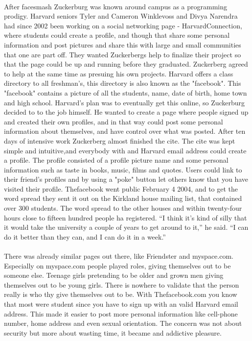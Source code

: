 \paragraph{}
After facesmash Zuckerburg was known around campus as a programming prodigy. Harvard seniors Tyler and Cameron Winklevoss and Divya Narendra had since 2002 been working on a social networking page - HarvardConnection, where students could create a profile, and though that share some personal information and post pictures and share this with large and small communities that one are part off. They wanted Zuckerbergs help to finalize their project so that the page could be up and running before they graduated. Zuckerberg agreed to help at the same time as presuing his own projects. Harvard offers a class directory to all freshman's, this directory is also known as the "facebook". This "facebook" contains a picture of all the students, name, date of birth, home town and high school. Harvard's plan was to eventually get this online, so Zuckerburg decided to to the job himself. He wanted to create a page where people signed up and created their own profiles, and in that way could post some personal information about themselves, and have control over what was posted. After ten days of intensive work Zuckerberg almost finished the cite. The cite was kept simple and intuitive,and everybody with and Harvard email address could create a profile. The profile consisted of a profile picture name and some personal information such as taste in books, music, films and quotes. Users could link to their friend's profiles and by using a "poke" button let others know that you have visited their profile. Thefacebook went public February 4 2004, and to get the word spread they sent it out on the Kirkland house mailing list, that contained over 300 students. The word spread to the other houses and within twenty-four hours close to fifteen hundred people ha registered. “I think it’s kind of silly that it would take the university a couple of years to get around to it,” he said. “I can do it better than they can, and I can do it in a week.” 

\paragraph{}
There was already similar pages out there, like Friendster and myspace.com. Especially on myspace.com people played roles, giving themselves out to be someone else. Teenage girls pretending to be older and grown men giving themselves out to be young girls. There is nowhere to validate that the person really is who thy give themselves out to be. With Thefacebook.com you know that most were student since you have to sign up with an valid Harvard email address. This made it easier to post more personal information like cell-phone number, home address and even sexual orientation. The concern was not about security but more about wasting time, it became and addictive pleasure. 

